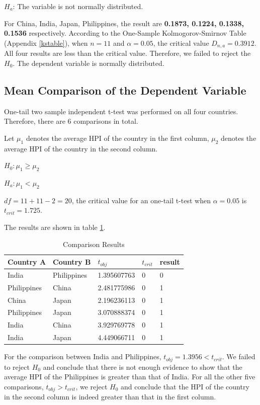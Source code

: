 \documentclass[11pt]{article}
\begin{document}
$H_a$: The variable is not normally distributed.

For China, India, Japan, Philippines, the result are \textbf{0.1873, 0.1224, 0.1338, 0.1536} respectively. According to the One-Sample Kolmogorov-Smirnov Table (Appendix \ref{kstable}), when $n=11$ and $\alpha=0.05$, the critical value $D_{n,a}=0.3912$. All four results are less than the critical value. Therefore, we failed to reject the $H_0$. The dependent variable is normally distributed.

\subsection{Mean Comparison of the Dependent Variable}\label{mean_comparison}
One-tail two sample independent t-test was performed on all four countries. Therefore, there are 6 comparisons in total.

Let $\mu_1$ denotes the average HPI of the country in the first column, $\mu_2$ denotes the average HPI of the country in the second column.

$H_0: \mu_1\geq \mu_2$

$H_a: \mu_1< \mu_2$

$df=11+11-2=20$, the critical value for an one-tail t-test when $\alpha=0.05$ is $t_{crit}=1.725$.

The results are shown in table \ref{tab:comparison_results}.
\begin{table}[H]
\centering
\begin{tabular}{|l|l|l|l|l|}
\hline
Country A   & Country B   & $t_{obj}$ & $t_{crit}$ & result \\ \hline
India       & Philippines & 1.395607763 & 0          & 0      \\ \hline
Philippines & China       & 2.481775986 & 0          & 1      \\ \hline
China       & Japan       & 2.196236113 & 0          & 1      \\ \hline
Philippines & Japan       & 3.070888374 & 0          & 1      \\ \hline
India       & China       & 3.929769778 & 0          & 1      \\ \hline
India       & Japan       & 4.449066711 & 0          & 1      \\ \hline
\end{tabular}
\caption{Comparison Results}
\label{tab:comparison_results}
\end{table}

For the comparison between India and Philippines, $t_{obj}=1.3956<t_{crit}$. We failed to reject $H_0$ and conclude that there is not enough evidence to show that the average HPI of the Philippines is greater than that of India. For all the other five comparisons, $t_{obj}>t_{crit}$, we reject $H_0$ and conclude that the HPI of the country in the second column is indeed greater than that in the first column.
\end{document}
